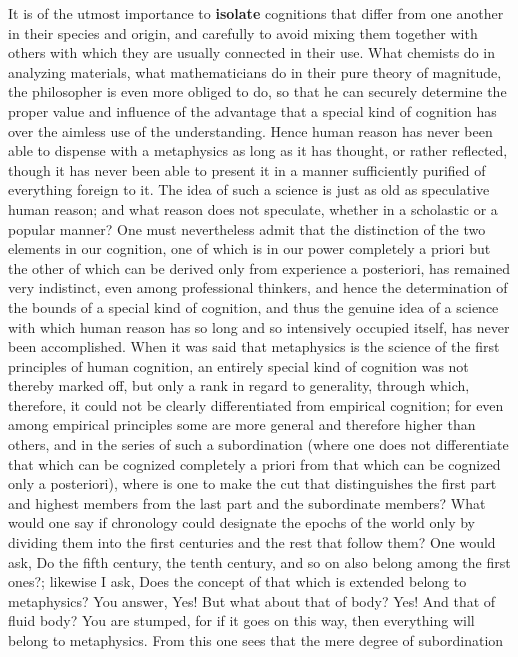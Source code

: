 \documentclass{article}
\begin{document}
It is of the utmost importance to \textbf{isolate} cognitions 
that differ from one another in their species and origin,
and carefully to avoid mixing them together with others
with which they are usually connected in their use. 
What chemists do in analyzing materials,
what mathematicians do in their pure theory of magnitude,
the philosopher is even more obliged to do, 
so that he can securely determine the proper value and influence
of the advantage that a special kind of cognition has
over the aimless use of the understanding.
Hence human reason has never been able to dispense with a metaphysics
as long as it has thought, or rather reflected,
though it has never been able to present it in a manner
sufficiently purified of everything foreign to it.
The idea of such a science is just as old as speculative human reason;
and what reason does not speculate, whether in a scholastic or a popular manner? 
One must nevertheless admit that the distinction of the two elements in our cognition,
one of which is in our power completely a priori
but the other of which can be derived only from experience a posteriori,
has remained very indistinct, even among professional thinkers,
and hence the determination of the bounds of a special kind of cognition,
and thus the genuine idea of a science with which human reason
has so long and so intensively occupied itself, has never been accomplished.
When it was said that metaphysics is
the science of the first principles of human cognition,
an entirely special kind of cognition was not thereby marked off,
but only a rank in regard to generality, through which, therefore,
it could not be clearly differentiated from empirical cognition;
for even among empirical principles some are more general
and therefore higher than others,
and in the series of such a subordination
(where one does not differentiate that which can be cognized completely a priori
from that which can be cognized only a posteriori),
where is one to make the cut that distinguishes
the first part and highest members
from the last part and the subordinate members?
What would one say if chronology could designate the epochs of the world only by
dividing them into the first centuries and the rest that follow them?
One would ask, Do the fifth century, the tenth century, and so on
also belong among the first ones?;
likewise I ask, Does the concept of that
which is extended belong to metaphysics?
You answer, Yes! But what about that of body?
Yes! And that of fluid body? You are stumped,
for if  it goes on this way,
then everything will belong to metaphysics. 
From this one sees that the mere degree of subordination 
\end{document}
